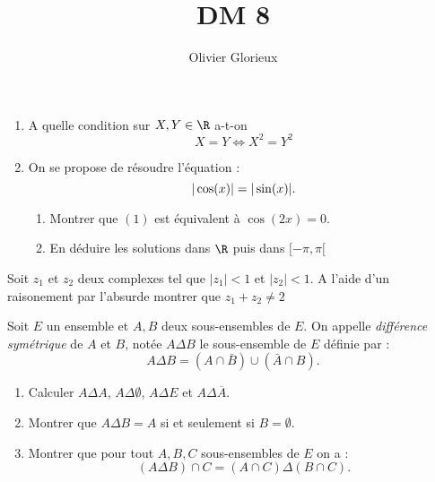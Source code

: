 \documentclass[a4paper, 11pt,reqno]{article}
\author{Olivier Glorieux}
\begin{document}
\title{DM 8
 }

 
\vspace{0.7cm}
\begin{exercice}
\begin{enumerate}
\item A quelle condition sur $X,Y\in \R$ a-t-on 
$$X=Y \Longleftrightarrow X^2=Y^2  $$

\item On se propose de résoudre l'équation :
\begin{equation}
|\cos(x)|=|\sin(x)|.\\
\end{equation}
\begin{enumerate}
\item Montrer que $(1)$ est équivalent à $\cos(2x)=0$. 
\item En déduire les solutions  dans $\R$ puis dans $[-\pi, \pi[$ 
\end{enumerate}

\end{enumerate}
\end{exercice}


\begin{exercice}
Soit $z_1 $ et $z_2$ deux complexes tel que $|z_1|<1 $ et $|z_2|<1$. A l'aide d'un raisonement par l'absurde montrer que $z_1+z_2\neq 2$
\end{exercice}

\begin{exercice}
Soit $E$ un ensemble et $A,B$ deux sous-ensembles de $E$. On appelle \emph{différence symétrique } de $A$ et $B$, notée $A\Delta B$ le sous-ensemble de $E$ définie par :
$$A \Delta  B =  (A\cap \bar{B})\cup \left(\bar{A}\cap B\right).$$
\begin{enumerate}
\item Calculer $A\Delta A$, $A\Delta \emptyset$, $A\Delta E$ et $A\Delta \overline{A}$.
\item Montrer que $A\Delta B= A$ si et seulement si $B=\emptyset.$
\item Montrer que pour tout $A,B,C$ sous-ensembles de $E$ on a :
$$(A\Delta B) \cap C = (A\cap C)\Delta (B\cap C).$$
\end{enumerate}
\end{exercice}
\end{document}
